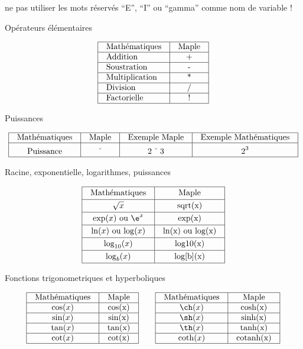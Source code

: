  ne pas utiliser les mots r\'eserv\'es ``E'', ``I'' ou ``gamma'' comme nom de variable !
\medskip



\Concept  Op\'erateurs \'el\'ementaires

$$\vbox{
\offinterlineskip
\halign{
\vrule#&\quad#\hfil\strut\quad&\vrule#&\quad\hfil#\hfil\quad&\vrule#\tabskip=0pt\cr
\noalign{\hrule}\cr
&Math\'ematiques&&Maple&\cr
\noalign{\hrule}\cr
&Addition&&+&\cr
\noalign{\hrule}\cr
&Soustration&&-&\cr
\noalign{\hrule}\cr
&Multiplication&&*&\cr
\noalign{\hrule}\cr
&Division&&/&\cr
\noalign{\hrule}\cr
&Factorielle&&!&\cr
\noalign{\hrule}\cr
}}
$$

\Concept  Puissances

$$\vbox{
\offinterlineskip
\halign{
\vrule#&\quad#\hfil\strut\quad&\vrule#&\quad\hfil#\hfil\quad&\vrule#&\quad#\hfil\quad&\vrule#&\quad#\hfil\quad&\vrule#\tabskip=0pt\cr
\noalign{\hrule}\cr
&Math\'ematiques&&Maple&&Exemple Maple&&Exemple Math\'ematiques&\cr
\noalign{\hrule}\cr
&\hfil Puissance&&$\hat{\quad}$&&\hfil$2\hat{\quad}3$&&\hfil$2^{3\strut}$&\cr
\noalign{\hrule}\cr
}}
$$


\Concept  Racine, exponentielle, logarithmes, puissances

$$\vbox{
\offinterlineskip
\halign{
\vrule#&$\quad\vcenter to1.5em{}$\hfil#\hfil\strut\quad&\vrule#&\quad\hfil#\hfil\quad&\vrule#\tabskip=0pt\cr
\noalign{\hrule}\cr
&Math\'ematiques&&Maple&\cr
\noalign{\hrule}\cr
&$\sqrt x$&&sqrt(x)&\cr
\noalign{\hrule}\cr
&$\exp(x)$ ou $\e^x$&&exp(x)&\cr
\noalign{\hrule}\cr
&$\ln(x)$ ou $\log(x)$&&ln(x) ou log(x)&\cr
\noalign{\hrule}\cr
&$\log_{10}(x)$&&log10(x)&\cr
\noalign{\hrule}\cr
&$\log_b(x)$&&log[b](x)&\cr
\noalign{\hrule}\cr
}}$$

\Concept  Fonctions trigonometriques et hyperboliques

$$\vbox{
\offinterlineskip
\halign{
\vrule#&\quad\hfil#\hfil\strut\quad&\vrule#&\quad\hfil#\hfil\quad&\vrule#\tabskip=0pt\cr
\noalign{\hrule}\cr
&Math\'ematiques&&Maple&\cr
\noalign{\hrule}\cr
&$\cos(x)$&&cos(x)&\cr
\noalign{\hrule}\cr
&$\sin(x)$&&sin(x)&\cr
\noalign{\hrule}\cr
&$\tan(x)$&&tan(x)&\cr
\noalign{\hrule}\cr
&$\cot(x)$&&cot(x)&\cr
\noalign{\hrule}\cr
}}\qquad
\vbox{
\offinterlineskip
\halign{
\vrule#&\quad\hfil#\hfil\strut\quad&\vrule#&\quad\hfil#\hfil\quad&\vrule#\tabskip=0pt\cr
\noalign{\hrule}\cr
&Math\'ematiques&&Maple&\cr
\noalign{\hrule}\cr
&$\ch(x)$&&cosh(x)&\cr
\noalign{\hrule}\cr
&$\sh(x)$&&sinh(x)&\cr
\noalign{\hrule}\cr
&$\th(x)$&&tanh(x)&\cr
\noalign{\hrule}\cr
&$\coth(x)$&&cotanh(x)&\cr
\noalign{\hrule}\cr
}}
$$

